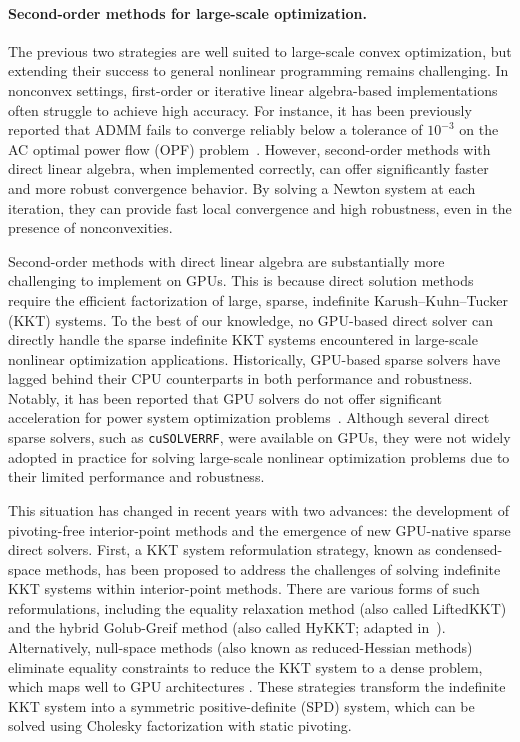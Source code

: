 \paragraph{Second-order methods for large-scale optimization.}
The previous two strategies are well suited to large-scale convex optimization, but extending their success to general nonlinear programming remains challenging.
In nonconvex settings, first-order or iterative linear algebra-based implementations often struggle to achieve high accuracy.
For instance, it has been previously reported that ADMM fails to converge reliably below a tolerance of $10^{-3}$ on the AC optimal power flow (OPF) problem~\cite{kimLeveragingGPUBatching2021}.
However, second-order methods with direct linear algebra, when implemented correctly, can offer significantly faster and more robust convergence behavior.
By solving a Newton system at each iteration, they can provide fast local convergence and high robustness, even in the presence of nonconvexities.

Second-order methods with direct linear algebra are substantially more challenging to implement on GPUs.
This is because direct solution methods require the efficient factorization of large, sparse, indefinite Karush–Kuhn–Tucker (KKT) systems.
To the best of our knowledge, no GPU-based direct solver can directly handle the sparse indefinite KKT systems encountered in large-scale nonlinear optimization applications.
Historically, GPU-based sparse solvers have lagged behind their CPU counterparts in both performance and robustness.
Notably, it has been reported that GPU solvers do not offer significant acceleration for power system optimization problems~\cite{swirydowicz2021linear,tasseff2019exploring}.
Although several direct sparse solvers, such as {\tt cuSOLVERRF}, were available on GPUs, they were not widely adopted in practice for solving large-scale nonlinear optimization problems due to their limited performance and robustness.

This situation has changed in recent years with two advances: the development of pivoting-free interior-point methods and the emergence of new GPU-native sparse direct solvers.
First, a KKT system reformulation strategy, known as condensed-space methods, has been proposed to address the challenges of solving indefinite KKT systems within interior-point methods.
There are various forms of such reformulations, including the equality relaxation method (also called LiftedKKT) and the hybrid Golub-Greif method (also called HyKKT; adapted in~\cite{regev2023hykkt}).
Alternatively, null-space methods (also known as reduced-Hessian methods) eliminate equality constraints to reduce the KKT system to a dense problem, which maps well to GPU architectures \cite{pacaud2022condensed}.
These strategies transform the indefinite KKT system into a symmetric positive-definite (SPD) system, which can be solved using Cholesky factorization with static pivoting.


